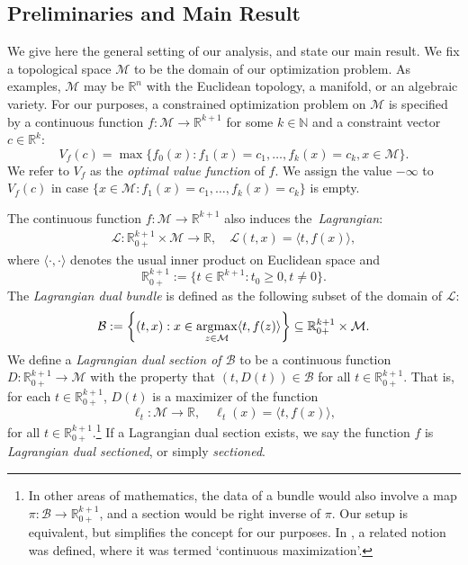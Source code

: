 \documentclass{article}
\numberwithin{equation}{section}
\newcommand{\cB}{\mathcal{B}}
\newcommand{\R}{\mathbb{R}}
\newcommand{\N}{\mathbb{N}}
\newcommand{\argmax}{\operatornamewithlimits{argmax}}
\newcommand{\cL}{\mathcal{L}}
\newcommand{\Rplus}{\R_{0+}}
\newcommand{\cM}{{\mathcal{M}}}
\renewcommand{\cB}{\mathcal{B}}
\newcommand{\Voptf}{V_{f}}
\newcommand{\MR}{ \Rplus^{k+1} \times \mathcal{M} }  %
\newcommand{\demph}[1]{\emph{{\color{RoyalBlue}#1}}}
\begin{document}
\subsection{Preliminaries and Main Result}
We give here the general setting of our analysis, and state our main result. We fix a topological space $\cM$ to be the domain of our optimization problem.
As examples, $\cM$ may be $\R^n$ with the Euclidean topology, a manifold, or an algebraic variety.
For our purposes, a constrained optimization problem on $\cM$ is specified by a continuous function $f : \cM \rightarrow \R^{k+1}$ for some $k \in \N$ and a constraint vector $c \in \R^k$:
\begin{equation}
     \label{eq:constrained} 
    V_f(c) = \max \{f_0(x) : f_1(x) = c_1, \dots, f_k(x) =  c_k, x \in \cM\}.\tag{opt-Main}
\end{equation}
We refer to $V_f$ as the \demph{optimal value function} of $f$. We assign the value $-\infty$ to $\Voptf(c)$ in case $\{x \in \cM : f_1(x) = c_1, \dots, f_k(x) =  c_k\}$ is empty.

\newcommand{\tDomain}{\Rplus^{k+1}}
\newcommand{\tDomainSmooth}{\R^{k+1}}

The continuous function 
$f:\cM\rightarrow \R^{k+1}$ also induces the~\demph{Lagrangian}: 
\begin{align}
\cL:\tDomain\times \cM\to\mathbb{R},\quad  \cL(t,x) = \langle t, f(x)\rangle, 
\end{align}
where $\langle \cdot, \cdot \rangle$ denotes the usual inner product on Euclidean space
and 
\[\tDomain := \{t \in \R^{k+1} : t_0 \ge 0, t \neq 0\}.\]
The  \demph{Lagrangian dual bundle} is defined as the following subset of the domain of $\mathcal{L}$: 
\begin{equation}
    \label{eq:bundle}
    \cB := \left\{(t,x) : x \in \argmax_{z \in \cM} \langle t, f(z)\rangle \right\} \subseteq \MR.
\end{equation}
We define a \demph{Lagrangian dual section of $\cB$} to be a continuous function $D : \tDomain \rightarrow \cM$ with  the property that $(t,D(t)) \in \cB$ for all $t \in \tDomain$. That is, for each $t \in \tDomain$, $D(t)$ is a maximizer of the function \begin{equation}
\ell_t:\cM\to \mathbb{R},\quad
\ell_t(x)=\langle t, f(x)\rangle,
\end{equation}
for all $t \in \tDomain$.\footnote{In other areas of mathematics, the data of a bundle would also involve a map $\pi : \cB \rightarrow \tDomain$, and a section would be right inverse of $\pi$. Our setup is equivalent, but simplifies the concept for our purposes.
In \cite{kevinthesis}, a related notion was defined, where it was termed `continuous maximization'.} 
If a Lagrangian dual section exists, we say the function $f$ is \demph{Lagrangian dual sectioned}, or simply \demph{sectioned}. 
\end{document}
